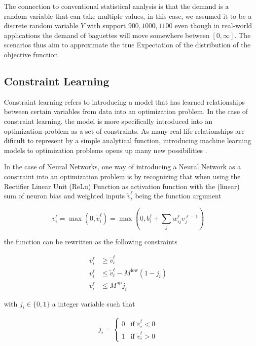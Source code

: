\documentclass[preprint,12pt]{elsarticle}
\begin{document}
The connection to conventional statistical analysis is that the demand is a random variable that can take multiple values, in this case, we assumed it to be a discrete random variable $Y$ with support ${900,1000,1100}$ even though in real-world applications the demand of baguettes will move somewhere between $[0,\infty]$. The scenarios thus aim to approximate the true Expectation of the distribution of the objective function. \cite{BirgeLouveauxStochasticProgramming}


\subsection{Constraint Learning} \label{sec:constraint_learning}

Constraint learning refers to introducing a model that has learned relationships between certain variables from data into an optimization problem. In the case of constraint learning, the model is more specifically introduced into an optimization problem as a set of constraints. As many real-life relationships are dificult to represent by a simple analytical function, introducing machine learning models to optimization problems opens up many new possibilities \cite{FAJEMISIN20241}.

In the case of Neural Networks, one way of introducing a Neural Network as a constraint into an optimization problem is by recognizing that when using the Rectifier Linear Unit (ReLu) Function as activation function with the (linear) sum of neuron bias and weighted inputs $\tilde{v}_i^\ell$ being the function argument


\begin{equation}
	v_i^\ell = \max(0, \tilde{v}_i^\ell) = \max(0,  b_i^\ell + \sum_j w_{ij}^\ell v_j^{\ell - 1})
\end{equation}


the function can be rewritten as the following constraints 

\begin{align}
	v_i^\ell &\geq \tilde{v}_i^\ell \\
	v_i^\ell &\leq \tilde{v}_i^\ell - M^{\text{low}}(1 - j_i) \\
	v_i^\ell &\leq M^{\text{up}} j_i
\end{align}

with $j_i \in \{0,1\}$ a integer variable such that

\begin{align}
	j_i =
	\begin{cases}
		0 & \text{if } \tilde{v}_i^\ell < 0 \\
		1 & \text{if } \tilde{v}_i^\ell > 0
	\end{cases}
\end{align}
\end{document}
